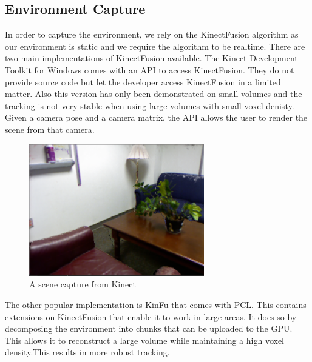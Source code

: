 \subsection{Environment Capture}
In order to capture the environment, we rely on the KinectFusion\cite{newcombe2011kinectfusion}  algorithm as our environment is static and we require the algorithm to be realtime. There are two main implementations of KinectFusion available. The Kinect Development Toolkit for Windows comes with an API to access KinectFusion. They do not provide source code but let the developer access KinectFusion in a limited matter. Also this version has only been demonstrated on small volumes and the tracking is not very stable when using large volumes with small voxel denisty. Given a camera pose and a camera matrix, the API allows the user to render the scene from that camera.\\
\begin{figure}[ht]
	\centering
	\includegraphics[width=3.0in]{images/scene2.png}
	\caption{A scene capture from Kinect}
	\label{fig:kinectFusionOut}
\end{figure}
The other popular implementation is KinFu that comes with PCL. This contains extensions on KinectFusion that enable it to work in large areas. It does so by decomposing the environment into chunks that can be uploaded to the GPU. This allows it to reconstruct a large volume while maintaining a high voxel density.This results in more robust tracking.  